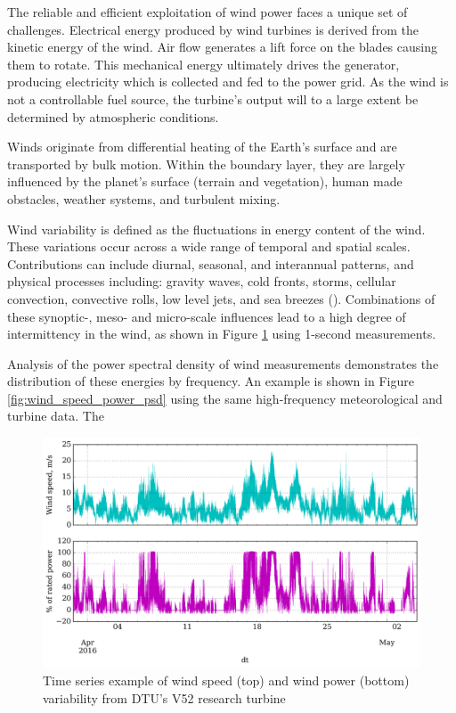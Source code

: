 The reliable and efficient exploitation of wind power faces a unique set of challenges. Electrical energy produced by wind turbines is derived from the kinetic energy of the wind. Air flow generates a lift force on the blades causing them to rotate. This mechanical energy ultimately drives the generator, producing electricity which is collected and fed to the power grid. As the wind is not a controllable fuel source, the turbine's output will to a large extent be determined by atmospheric conditions.

Winds originate from differential heating of the Earth's surface and are transported by bulk motion. Within the boundary layer, they are largely influenced by the planet's surface (terrain and vegetation), human made obstacles, weather systems, and turbulent mixing.

Wind variability is defined as the fluctuations in energy content of the wind. These variations occur across a wide range of temporal and spatial scales. Contributions can include diurnal, seasonal, and interannual patterns, and physical processes including: gravity waves, cold fronts, storms, cellular convection, convective rolls, low level jets, and sea breezes (\cite{vincent_forecasting_2017}). Combinations of these synoptic-, meso- and micro-scale influences lead to a high degree of intermittency in the wind, as shown in Figure \ref{fig:wind_speed_power_ts} using 1-second measurements.

Analysis of the power spectral density of wind measurements demonstrates the distribution of these energies by frequency. 
An example is shown in Figure \ref{fig:wind_speed_power_psd} using the same high-frequency meteorological and turbine data. The 

\begin{figure}[htbp]
    \centering
        \includegraphics[width=1.0\textwidth]{graphics/intro/variability/wind_speed_power_ts.png}
    \caption{Time series example of wind speed (top) and wind power (bottom) variability from DTU's V52 research turbine}
    \label{fig:wind_speed_power_ts}
\end{figure}

